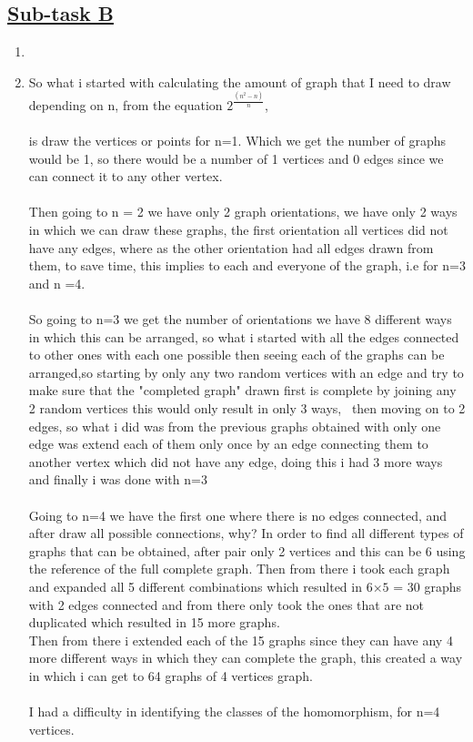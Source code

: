 \documentclass{Assignment}
\begin{document}
\subsection*{\underline{Sub-task B}}
\begin{enumerate}
	\item \newpage
	\item So what i started with calculating the amount of graph that I need to draw depending on n, from the equation $2^{ \frac{\left(n^2-n\right)}{n}}$,\\\\
	is draw the vertices or points for n=1. Which we get the number of graphs would be 1, so there would be a number of 1 vertices and 0 edges since we can connect it to any other vertex.\\\\Then going to n = 2 we have only 2 graph orientations, we have only 2 ways in which we can draw these graphs, the first orientation all vertices did not have any edges, where as the other orientation had all edges drawn from them, to save time, this implies to each and everyone of the graph, i.e for n=3 and n =4.\\\\ 
	So going to n=3 we get the number of orientations we have 8 different ways in which this can be arranged, so what i started with all the edges connected to other ones with each one possible then seeing each of the graphs can be arranged,so starting by only any two random vertices with an edge and try to make sure that the "completed graph" drawn first is complete by joining any 2 random vertices this would only result in only 3 ways, \ then moving on to 2 edges, so what i did was from the previous graphs obtained with only one edge was extend each of them only once by an edge connecting them to another vertex which did not have any edge, doing this i had 3 more ways and finally i was done with n=3\\\\
	Going to n=4 we have the first one where there is no edges connected, and after draw all possible connections, why? In order to find all different types of graphs that can be obtained, after pair only 2 vertices and this can be 6 using the reference of the full complete graph. Then from there i took each graph and expanded all 5 different combinations which resulted in 6$\times 5$ = 30 graphs with 2 edges connected and from there only took the ones that are not duplicated which resulted in 15 more graphs.\\ Then from there i extended each of the 15 graphs since they can have any 4 more different ways in which they can complete the graph, this created a way in which i can get to 64 graphs of 4 vertices graph.\\\\I had a difficulty in identifying the classes of the homomorphism, for n=4 vertices.
\end{enumerate}
\end{document}
